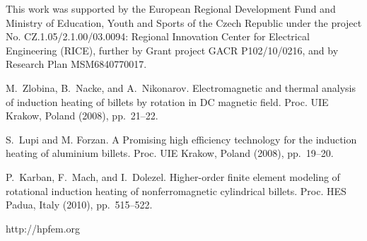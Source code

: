 This work was supported by the European Regional Development Fund and Ministry of Education, Youth and Sports of the Czech Republic under the project No. CZ.1.05/2.1.00/03.0094: Regional Innovation Center for Electrical Engineering (RICE), further by Grant project GACR P102/10/0216, and by Research Plan MSM6840770017.


\begin{thebibliography}{10}
{\sc M.~Zlobina, B.~Nacke, and A.~Nikonarov}. {Electromagnetic and thermal analysis of induction heating of billets by rotation in DC magnetic field}. Proc. UIE Krakow, Poland (2008), pp.~21--22.

{\sc S.~Lupi and M. Forzan}. {A Promising high efficiency technology for the induction heating of aluminium billets}. Proc. UIE Krakow, Poland (2008), pp.~19--20.

{\sc P.~Karban, F.~Mach, and I.~Dolezel}. {Higher-order finite element modeling of rotational induction heating of nonferromagnetic cylindrical billets}. Proc. HES Padua, Italy (2010), pp.~515--522.

{http://hpfem.org}
\end{thebibliography}